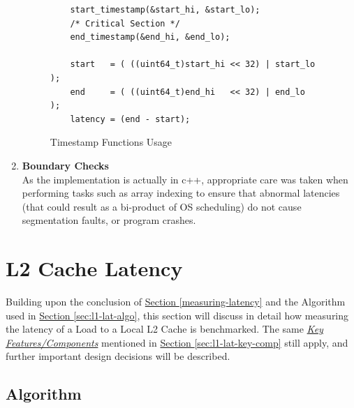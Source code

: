 \documentclass[bsc,frontabs,twoside,singlespacing,parskip,deptreport]{infthesis}     %
\begin{document}
\begin{enumerate}
{\begin{figure}[h!]
\begin{verbatim}
    start_timestamp(&start_hi, &start_lo);
    /* Critical Section */
    end_timestamp(&end_hi, &end_lo);  
    
    start   = ( ((uint64_t)start_hi << 32) | start_lo );
    end     = ( ((uint64_t)end_hi   << 32) | end_lo   );
    latency = (end - start);
        \end{verbatim}
        \caption{Timestamp Functions Usage}
        \label{fig:timestamp_usage_l1}
    \end{figure}
    
    }
    \item{{\bf Boundary Checks} \\
    As the implementation is actually in c++, appropriate care was taken when performing tasks such as array indexing to ensure that abnormal latencies (that could result as a bi-product of OS scheduling) do not cause segmentation faults, or program crashes. }
\end{enumerate}



\newpage

\section{L2 Cache Latency}\label{sec:l2-cache-latency}
Building upon the conclusion of \hyperref[measuring-latency]{Section \ref{measuring-latency}} and the Algorithm used in \hyperref[measuring-latency]{Section \ref{sec:l1-lat-algo}}, this section will discuss in detail how measuring the latency of a Load to a Local L2 Cache is benchmarked. The same \hyperref[sec:l1-lat-key-comp]{\emph{Key Features/Components}} mentioned in \hyperref[measuring-latency]{Section \ref{sec:l1-lat-key-comp}} still apply, and further important design decisions will be described.

\subsection{Algorithm}\label{sec:l2-lat-algo}
\end{document}
